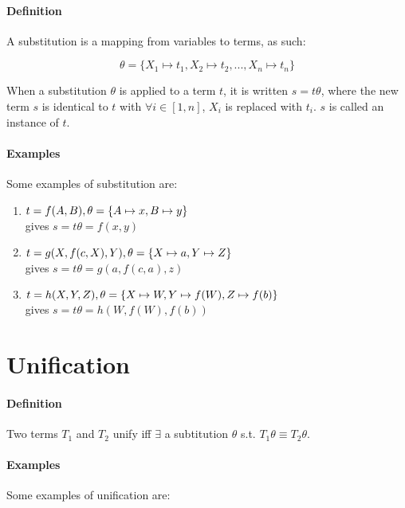 \documentclass{article}
\begin{document}
\begin{multicols}{2}
  \paragraph{Definition} A substitution is a mapping from variables to terms, as such:
  
  $$\theta = \{ X_1 \mapsto t_1, X_2 \mapsto t_2, ..., X_n \mapsto t_n \}$$
  
  When a substitution $\theta$ is applied to a term $t$, it is written $s = t\theta$, where the new term $s$ is identical to $t$ with $\forall i \in [1, n]$, $X_i$ is replaced with $t_i$. $s$ is called an instance of $t$.
  
  \paragraph{Examples} Some examples of substitution are:
  
  \begin{enumerate}
  \item $t = f(A,B),\\ \theta = \{A \mapsto x, B \mapsto y\}$\\ gives $s=t\theta=f(x, y)$
  \item $t = g(X, f(c, X), Y),\\ \theta = \{X \mapsto a, Y \mapsto Z\}$\\ gives $s=t\theta=g(a, f(c, a), z)$
  \item $t = h(X, Y, Z),\\ \theta = \{X \mapsto W, Y \mapsto f(W), Z \mapsto f(b)\}$\\ gives $s=t\theta=h(W, f(W), f(b))$
  \end{enumerate}
  
  \section{Unification}
  
  \paragraph{Definition} Two terms $T_1$ and $T_2$ unify iff $\exists$ a subtitution $\theta$ s.t. $T_1\theta \equiv T_2\theta$.
  
  \paragraph{Examples} Some examples of unification are:
  

\end{multicols}
\end{document}
